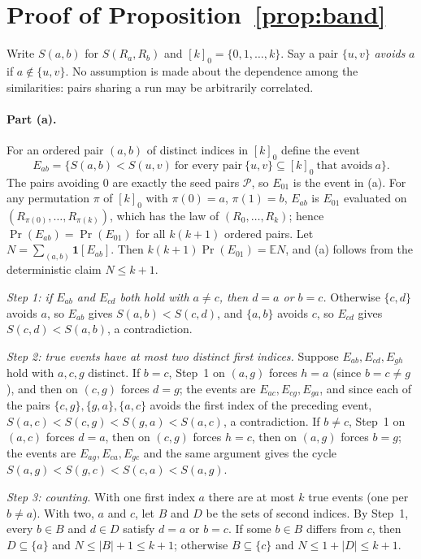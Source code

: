 \documentclass{article}
\begin{document}
\appendix
\section{Proof of Proposition~\ref{prop:band}}
\label{app:proof}
Write $S(a,b)$ for $S(R_a,R_b)$ and $[k]_0=\{0,1,\dots,k\}$. Say a pair $\{u,v\}$ \emph{avoids} $a$ if $a\notin\{u,v\}$. No assumption is made about the dependence among the similarities: pairs sharing a run may be arbitrarily correlated.

\paragraph{Part (a).} For an ordered pair $(a,b)$ of distinct indices in $[k]_0$ define the event
\[
E_{ab}=\big\{S(a,b)<S(u,v)\ \text{for every pair}\ \{u,v\}\subseteq[k]_0\ \text{that avoids}\ a\big\}.
\]
The pairs avoiding $0$ are exactly the seed pairs $\mathcal P$, so $E_{01}$ is the event in (a). For any permutation $\pi$ of $[k]_0$ with $\pi(0)=a$, $\pi(1)=b$, $E_{ab}$ is $E_{01}$ evaluated on $(R_{\pi(0)},\dots,R_{\pi(k)})$, which has the law of $(R_0,\dots,R_k)$; hence $\Pr(E_{ab})=\Pr(E_{01})$ for all $k(k+1)$ ordered pairs. Let $N=\sum_{(a,b)}\mathbf 1[E_{ab}]$. Then $k(k+1)\Pr(E_{01})=\mathbb E N$, and (a) follows from the deterministic claim $N\le k+1$.

\emph{Step 1: if $E_{ab}$ and $E_{cd}$ both hold with $a\ne c$, then $d=a$ or $b=c$.} Otherwise $\{c,d\}$ avoids $a$, so $E_{ab}$ gives $S(a,b)<S(c,d)$, and $\{a,b\}$ avoids $c$, so $E_{cd}$ gives $S(c,d)<S(a,b)$, a contradiction.

\emph{Step 2: true events have at most two distinct first indices.} Suppose $E_{ab},E_{cd},E_{gh}$ hold with $a,c,g$ distinct. If $b=c$, Step~1 on $(a,g)$ forces $h=a$ (since $b=c\ne g$), and then on $(c,g)$ forces $d=g$; the events are $E_{ac},E_{cg},E_{ga}$, and since each of the pairs $\{c,g\},\{g,a\},\{a,c\}$ avoids the first index of the preceding event, $S(a,c)<S(c,g)<S(g,a)<S(a,c)$, a contradiction. If $b\ne c$, Step~1 on $(a,c)$ forces $d=a$, then on $(c,g)$ forces $h=c$, then on $(a,g)$ forces $b=g$; the events are $E_{ag},E_{ca},E_{gc}$ and the same argument gives the cycle $S(a,g)<S(g,c)<S(c,a)<S(a,g)$.

\emph{Step 3: counting.} With one first index $a$ there are at most $k$ true events (one per $b\ne a$). With two, $a$ and $c$, let $B$ and $D$ be the sets of second indices. By Step~1, every $b\in B$ and $d\in D$ satisfy $d=a$ or $b=c$. If some $b\in B$ differs from $c$, then $D\subseteq\{a\}$ and $N\le|B|+1\le k+1$; otherwise $B\subseteq\{c\}$ and $N\le1+|D|\le k+1$.
\end{document}
